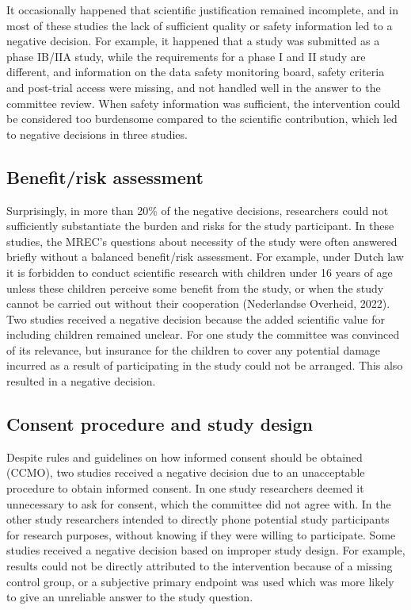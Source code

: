 \documentclass[authordate, meta]{jote-new-article}
\begin{document}
It occasionally happened that scientific justification remained incomplete, and in most of these studies the lack of sufficient quality or safety information led to a negative decision. For example, it happened that a study was submitted as a phase IB/IIA study, while the requirements for a phase I and II study are different, and information on the data safety monitoring board, safety criteria and post-trial access were missing, and not handled well in the answer to the committee review. When safety information was sufficient, the intervention could be considered too burdensome compared to the scientific contribution, which led to negative decisions in three studies.







\subsection{Benefit/risk assessment}



Surprisingly, in more than 20\% of the negative decisions, researchers could not sufficiently substantiate the burden and risks for the study participant. In these studies, the MREC's questions about necessity of the study were often answered briefly without a balanced benefit/risk assessment. For example, under Dutch law it is forbidden to conduct scientific research with children under 16 years of age unless these children perceive some benefit from the study, or when the study cannot be carried out without their cooperation (Nederlandse Overheid, 2022). Two studies received a negative decision because the added scientific value for including children remained unclear. For one study the committee was convinced of its relevance, but insurance for the children to cover any potential damage incurred as a result of participating in the study could not be arranged. This also resulted in a negative decision.







\subsection{Consent procedure and study design}



Despite rules and guidelines on how informed consent should be obtained (CCMO), two studies received a negative decision due to an unacceptable procedure to obtain informed consent. In one study researchers deemed it unnecessary to ask for consent, which the committee did not agree with. In the other study researchers intended to directly phone potential study participants for research purposes, without knowing if they were willing to participate. Some studies received a negative decision based on improper study design. For example, results could not be directly attributed to the intervention because of a missing control group, or a subjective primary endpoint was used which was more likely to give an unreliable answer to the study question.
\end{document}
